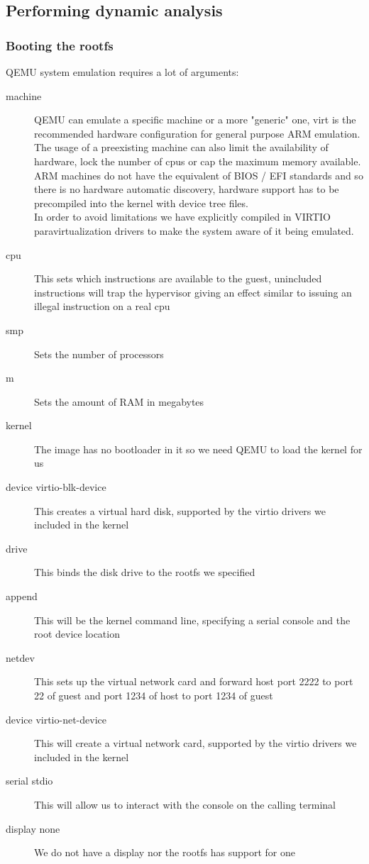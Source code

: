 \subsection{Performing dynamic analysis}
\begin{frame}[fragile]
  \frametitle{Booting the rootfs}
  
\end{frame}
 {
  QEMU system emulation requires a lot of arguments:
  \begin{description}
    \item[machine] QEMU can emulate a specific machine or a more "generic" one,
      virt is the recommended hardware configuration for general purpose ARM emulation. \\
      The usage of a preexisting machine can also limit the availability of hardware, lock the number of cpus or cap the maximum memory available. \\
      ARM machines do not have the equivalent of BIOS / EFI standards and so there is no hardware automatic discovery, hardware support has to be precompiled into the kernel with device tree files. \\
      In order to avoid limitations we have explicitly compiled in VIRTIO paravirtualization drivers to make the system aware of it being emulated.
    \item[cpu] This sets which instructions are available to the guest,
      unincluded instructions will trap the hypervisor giving an effect similar to issuing an illegal instruction on a real cpu
    \item[smp] Sets the number of processors
    \item[m] Sets the amount of RAM in megabytes
    \item[kernel] The image has no bootloader in it so we need QEMU to load the kernel for us
    \item[device virtio-blk-device] This creates a virtual hard disk, supported by the virtio drivers we included in the kernel
    \item[drive] This binds the disk drive to the rootfs we specified
    \item[append] This will be the kernel command line, specifying a serial console and the root device location
    \item[netdev] This sets up the virtual network card and forward host port 2222 to port 22 of guest and port 1234 of host to port 1234 of guest
    \item[device virtio-net-device] This will create a virtual network card, supported by the virtio drivers we included in the kernel
    \item[serial stdio] This will allow us to interact with the console on the calling terminal
    \item[display none] We do not have a display nor the rootfs has support for one
  \end{description}
}

